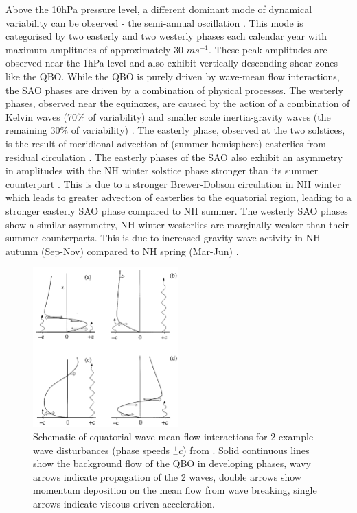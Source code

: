 Above the 10hPa pressure level, a different dominant mode of dynamical variability can be observed - the semi-annual oscillation \citep{Baldwin2001}. This mode is categorised by two easterly and two westerly phases each calendar year with maximum amplitudes of approximately 30 $ms^{-1}$. These peak amplitudes are observed near the 1hPa level and also exhibit vertically descending shear zones like the QBO. While the QBO is purely driven by wave-mean flow interactions, the SAO phases are driven by a combination of physical processes. The westerly phases, observed near the equinoxes, are caused by the action of a combination of Kelvin waves (70\% of variability) and smaller scale inertia-gravity waves (the remaining 30\% of variability) \citep{Dunkerton1982,Hitchman1988}. The easterly phase, observed at the two solstices, is the result of meridional advection of (summer hemisphere) easterlies from residual circulation \citep{HoltonWerb1980,MahlmanJ.D.1980}. The easterly phases of the SAO also exhibit an asymmetry in amplitudes with the NH winter solstice phase stronger than its summer counterpart \citep{Dunkerton1982}. This is due to a stronger Brewer-Dobson circulation in NH winter which leads to greater advection of easterlies to the equatorial region, leading to a stronger easterly SAO phase compared to NH summer. The westerly SAO phases show a similar asymmetry, NH winter westerlies are marginally weaker than their summer counterparts. This is due to increased gravity wave activity in NH autumn (Sep-Nov) compared to NH spring (Mar-Jun) \citep{Ray98}. 



\begin{figure}[h!]
\centering
    \includegraphics[width=0.5\textwidth]{Figures/Figures-background/Schematic_of_QBO_waves.png}
    \caption{Schematic of equatorial wave-mean flow interactions for 2 example wave disturbances (phase speeds $^+_- c$) from \cite{Plumb1984}. Solid continuous lines show the background flow of the QBO in developing phases, wavy arrows indicate propagation of the 2 waves, double arrows show momentum deposition on the mean flow from wave breaking, single arrows indicate viscous-driven acceleration.}
    \label{fig:QBO_wave_schematic}
\centering
\end{figure}


